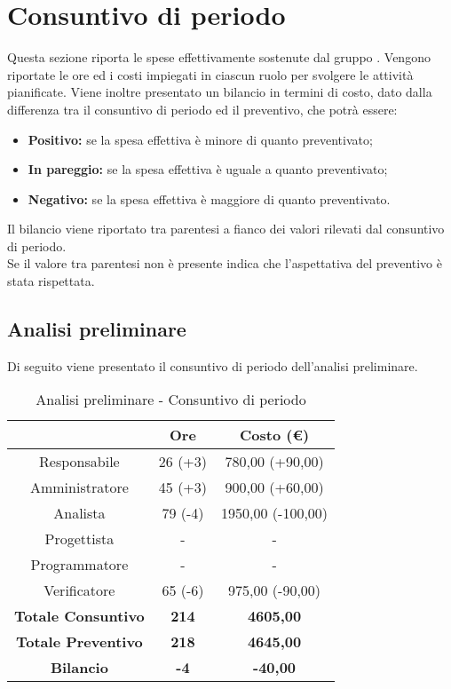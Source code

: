 \section{Consuntivo di periodo} \label{section:consuntivo}
Questa sezione riporta le spese effettivamente sostenute dal gruppo \groupName.
Vengono riportate le ore ed i costi impiegati in ciascun ruolo per svolgere le attività pianificate.
Viene inoltre presentato un bilancio in termini di costo, dato dalla differenza tra il consuntivo di periodo ed il preventivo, che potrà essere:
\begin{itemize}
    \item \textbf{Positivo:} se la spesa effettiva è minore di quanto preventivato;
    \item \textbf{In pareggio:} se la spesa effettiva è uguale a quanto preventivato;
    \item \textbf{Negativo:} se la spesa effettiva è maggiore di quanto preventivato.
\end{itemize}
Il bilancio viene riportato tra parentesi a fianco dei valori rilevati dal consuntivo di periodo. 
\\Se il valore tra parentesi non è presente indica che l'aspettativa del preventivo è stata rispettata.
\pagebreak

\subsection{Analisi preliminare} \label{subsection:consuntivo_analisi}
Di seguito viene presentato il consuntivo di periodo dell'analisi preliminare.
\begin{table}[H]
    \centering
    \renewcommand{\arraystretch}{1.8}
    \begin{tabular}{c|c|c}
      \rowcolor[HTML]{125E28} 
      \multicolumn{1}{c}{\color[HTML]{FFFFFF}\textbf{Ruolo}}
      & \multicolumn{1}{c}{\color[HTML]{FFFFFF}\textbf{Ore}}
      & \multicolumn{1}{c}{\color[HTML]{FFFFFF}\textbf{Costo (€)}}\\
      \hline
      Responsabile      & 26 (+3) & 780,00 (+90,00)\\
      Amministratore    & 45 (+3) & 900,00 (+60,00)\\
      Analista          & 79 (-4) & 1950,00 (-100,00)\\
      Progettista       & - & -\\
      Programmatore     & - & -\\
      Verificatore      & 65 (-6) & 975,00 (-90,00)\\
      \textbf{Totale Consuntivo} & \textbf{214} & \textbf{4605,00}\\
      \textbf{Totale Preventivo} & \textbf{218} & \textbf{4645,00}\\
      \textbf{Bilancio} & \textbf{-4} & \textbf{-40,00}\\
    \end{tabular}
    \caption{Analisi preliminare - Consuntivo di periodo}
  \end{table}


